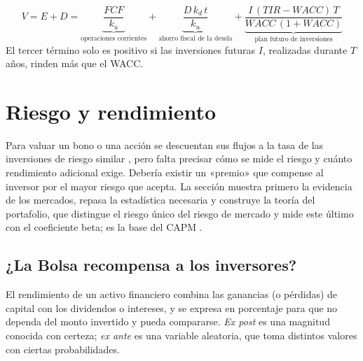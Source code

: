 \begin{formulaBox}
\[
V = E + D = \underbrace{\frac{FCF}{k_u}}_{\text{operaciones corrientes}}
  + \underbrace{\frac{D\,k_d\,t}{k_u}}_{\text{ahorro fiscal de la deuda}}
  + \underbrace{\frac{I\,(TIR - WACC)\,T}{WACC\,(1+WACC)}}_{\text{plan futuro de inversiones}}
\]
El tercer término solo es positivo si las inversiones futuras $I$, realizadas durante $T$ años, rinden más que el WACC.
\end{formulaBox}

\section{Riesgo y rendimiento}\label{sec:u5-riesgo}

Para valuar un bono o una acción se descuentan sus flujos a la tasa de las inversiones de riesgo similar , pero falta precisar cómo se mide el riesgo y cuánto rendimiento adicional exige. Debería existir un «premio» que compense al inversor por el mayor riesgo que acepta. La sección muestra primero la evidencia de los mercados, repasa la estadística necesaria y construye la teoría del portafolio, que distingue el riesgo único del riesgo de mercado y mide este último con el coeficiente beta; es la base del CAPM .

\subsection{¿La Bolsa recompensa a los inversores?}

El rendimiento de un activo financiero combina las ganancias (o pérdidas) de capital con los dividendos o intereses, y se expresa en porcentaje para que no dependa del monto invertido y pueda compararse. \emph{Ex post} es una magnitud conocida con certeza; \emph{ex ante} es una variable aleatoria, que toma distintos valores con ciertas probabilidades.

